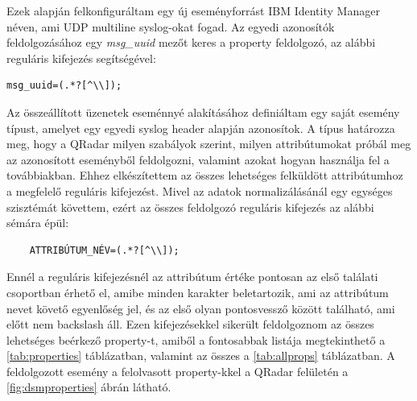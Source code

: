 Ezek alapján felkonfiguráltam egy új eseményforrást IBM Identity Manager néven, ami UDP multiline syslog-okat fogad. Az egyedi azonosítók feldolgozásához egy \textit{msg\_uuid} mezőt keres a property feldolgozó, az alábbi reguláris kifejezés segítségével: 

\begin{lstlisting}
msg_uuid=(.*?[^\\]);
\end{lstlisting}

Az összeállított üzenetek eseménnyé alakításához definiáltam egy saját esemény típust, amelyet egy egyedi syslog header alapján azonosítok. A típus határozza meg, hogy a QRadar milyen szabályok szerint, milyen attribútumokat próbál meg az azonosított eseményből feldolgozni, valamint azokat hogyan használja fel a továbbiakban. Ehhez elkészítettem az összes lehetséges felküldött attribútumhoz a megfelelő reguláris kifejezést. Mivel az adatok normalizálásánál egy egységes szisztémát követtem, ezért az összes feldolgozó reguláris kifejezés az alábbi sémára épül:

\begin{lstlisting}
	ATTRIBÚTUM_NÉV=(.*?[^\\]);
\end{lstlisting}

Ennél a reguláris kifejezésnél az attribútum értéke pontosan az első találati csoportban érhető el, amibe minden karakter beletartozik, ami az attribútum nevet követő egyenlőség jel, és az első olyan pontosvessző között található, ami előtt nem backslash áll. Ezen kifejezésekkel sikerült feldolgoznom az összes lehetséges beérkező property-t, amiből a fontosabbak listája megtekinthető a \ref{tab:properties} táblázatban, valamint az összes a \ref{tab:allprops} táblázatban. A feldolgozott esemény a felolvasott property-kkel a QRadar felületén a \ref{fig:dsmproperties} ábrán látható.



